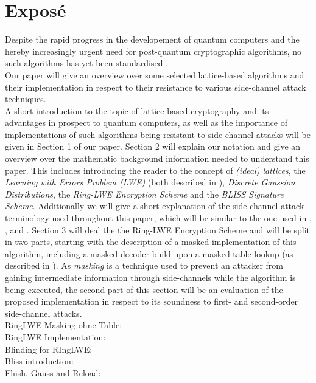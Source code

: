 %
%

\chapter{Expos\'{e}}
Despite the rapid progress in the developement of quantum computers and the hereby increasingly urgent need for post-quantum cryptographic algorithms, no such algorithms has yet been standardised \cite{Nist}.\\
Our paper will give an overview over some selected lattice-based algorithms and their implementation in respect to their resistance to various side-channel attack techniques.\\
A short introduction to the topic of lattice-based cryptography and its advantages in prospect to quantum computers, %
as well as the importance of implementations of such algorithms being resistant to side-channel attacks will be given in Section 1 of our paper. Section 2 will explain our notation and give an overview over the mathematic background information needed to understand this paper. This includes introducing the reader to the concept of \textit{(ideal) lattices}, the \textit{Learning with Errors Problem (LWE)} (both described in \cite{cryptoeprint:2012:230}), \textit{Discrete Gaussion Distributions}, the \textit{Ring-LWE Encryption Scheme} and the \textit{BLISS Signature Scheme}. Additionally we will give a short explanation of the side-channel attack terminology used throughout this paper, which will be similar to the one used in \cite{DBLP:conf/crypto/KocherJJ99}, \cite{Kocher2011}, \cite{cryptoeprint:2010:646} and \cite{cryptoeprint:2010:385}. Section 3 will deal the the Ring-LWE Encryption Scheme and will be split in two parts, starting with the description of a masked implementation of this algorithm, including a masked decoder build upon a masked table lookup (as described in \cite{maskedRing}). As \textit{masking} is a technique used to prevent an attacker from gaining intermediate information through side-channels while the algorithm is being executed, the second part of this section will be an evaluation of the proposed implementation in respect to its soundness to first- and second-order side-channel attacks.\\

RingLWE Masking ohne Table: \cite{Reparaz2016} \\
RingLWE Implementation: \cite{Pöppelmann2014} \\
Blinding for RIngLWE: \cite{cryptoeprint:2016:276} \\
Bliss introduction: \cite{cryptoeprint:2013:383} \\
Flush, Gauss and Reload: \cite{cryptoeprint:2016:300} \\